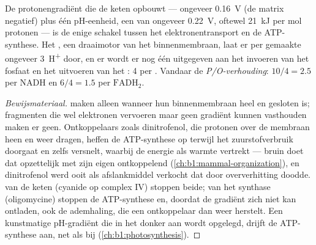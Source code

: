 \begin{theorem}\label{thm:b1:respiration-fermentation:chemiosmosis}
De protonengradiënt die de keten opbouwt --- ongeveer \qty{0.16}{V}
 (de matrix negatief) plus één pH-eenheid, een
\emph{} van ongeveer \qty{0.22}{V}, oftewel \qty{21}{kJ} per
mol protonen --- is de enige schakel tussen het elektronentransport en de
ATP-synthese. Het , een draaimotor van het binnenmembraan, laat er per
gemaakte  ongeveer \qty{3}{H^+} door, en er wordt er nog één uitgegeven aan het
invoeren van het fosfaat en het uitvoeren van het : 4 per . Vandaar de
\emph{P/O-verhouding}: $10/4 = 2.5$  per NADH en
$6/4 = 1.5$ per $\mathrm{FADH_2}$.
\end{theorem}
\begin{proof}[Bewijsmateriaal]
 maken alleen  wanneer hun binnenmembraan heel en gesloten is;
fragmenten die wel elektronen vervoeren maar geen gradiënt kunnen vasthouden maken
er geen. Ontkoppelaars zoals dinitrofenol, die protonen over de membraan heen en
weer dragen, heffen de ATP-synthese op terwijl het zuurstofverbruik doorgaat en
zelfs versnelt, waarbij de energie als warmte vertrekt --- bruin  doet dat
opzettelijk met zijn eigen ontkoppelend 
(\cref{ch:b1:mammal-organization}), en dinitrofenol werd ooit als afslankmiddel
verkocht dat door oververhitting doodde.  van de keten (cyanide op complex
IV) stoppen beide;  van het synthase (oligomycine) stoppen de ATP-synthese
en, doordat de gradiënt zich niet kan ontladen, ook de ademhaling, die een
ontkoppelaar dan weer herstelt. Een kunstmatige pH-gradiënt die in het donker aan
 wordt opgelegd, drijft de ATP-synthese aan, net als bij
 (\cref{ch:b1:photosynthesis}).
\end{proof}

